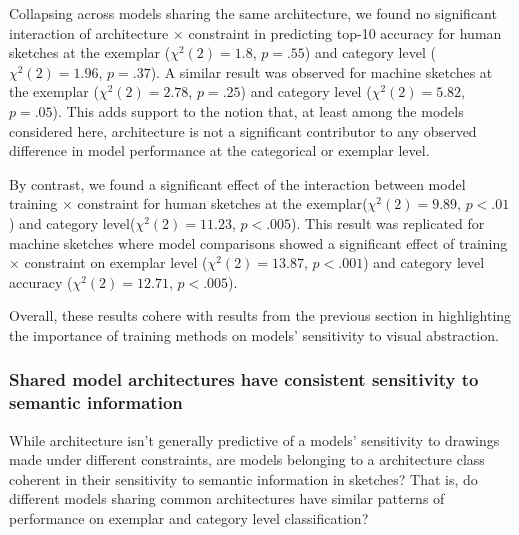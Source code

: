 \documentclass[10pt,letterpaper]{article}
\begin{document}
Collapsing across models sharing the same architecture, we found no significant interaction of architecture $\times$ constraint in predicting top-10 accuracy for human sketches at the exemplar ($\chi^2(2) = 1.8$, $p = .55$) and category level ($\chi^2(2) = 1.96$, $p = .37$). 
A similar result was observed for machine sketches at the exemplar ($\chi^2(2) = 2.78$, $p = .25$) and category level ($\chi^2(2) = 5.82$, $p = .05$).
This adds support to the notion that, at least among the models considered here, architecture is not a significant contributor to any observed difference in model performance at the categorical or exemplar level. 

By contrast, we found a significant effect of the interaction between model training $\times$ constraint for human sketches at the exemplar($\chi^2(2) = 9.89$, $p < .01$) and category level($\chi^2(2) = 11.23$, $p < .005$).  This result was replicated for machine sketches where model comparisons showed a significant effect of training $\times$ constraint on exemplar level ($\chi^2(2) = 13.87$, $p < .001$) and category level accuracy ($\chi^2(2) = 12.71$, $p < .005$).

Overall, these results cohere with results from the previous section in highlighting the importance of training methods on models' sensitivity to visual abstraction.

\subsubsection{Shared model architectures have consistent sensitivity to semantic information}

While architecture isn't generally predictive of a models' sensitivity to drawings made under different constraints, are models belonging to a architecture class coherent in their sensitivity to semantic information in sketches? That is, do different models sharing common architectures have similar patterns of performance on exemplar and category level classification?
\end{document}
